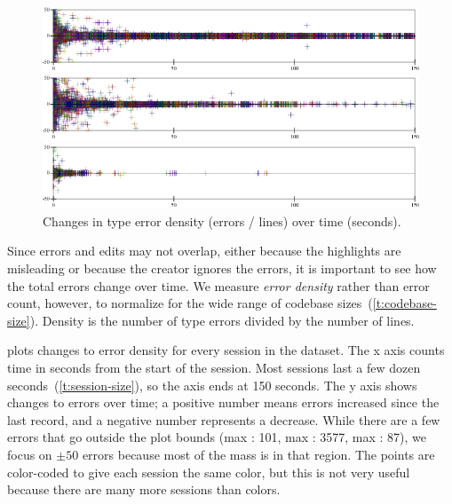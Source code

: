 \documentclass[english,submission,cleveref]{programming}
\begin{document}
\begin{figure}[t]\centering

  \mnocheck{}
  \includegraphics[width=\columnwidth]{img/error-count-nocheck-row--te-density-diff.pdf}

  \mnonstrict{}
  \includegraphics[width=\columnwidth]{img/error-count-nonstrict-row--te-density-diff.pdf}

  \mstrict{}
  \includegraphics[width=\columnwidth]{img/error-count-strict-row--te-density-diff.pdf}
  \caption{Changes in type error density (errors / lines) over time (seconds).}
  \label{f:error-density}
\end{figure}

Since errors and edits may not overlap, either because the highlights
are misleading or because the creator ignores the errors, it is important
to see how the total errors change over time.
We measure \emph{error density} rather than error count, however,
to normalize for the wide range of codebase sizes~(\cref{t:codebase-size}).
Density is the number of type errors divided by the number of lines.

 plots changes to error density for every session in the dataset.
The x axis counts time in seconds from the start of the session.
Most sessions last a few dozen seconds~(\cref{t:session-size}), so the axis
ends at 150 seconds.
The y axis shows changes to errors over time; a positive number means errors
increased since the last record, and a negative number represents a decrease.
While there are a few errors that go outside the plot bounds
(max \mnocheck{}: 101, max \mnonstrict{}: 3577, max \mstrict{}: 87), we focus
on $\pm{}50$ errors because most of the mass is in that region.
The points are color-coded to give each session the same color, but this is not
very useful because there are many more sessions than colors.
\end{document}
